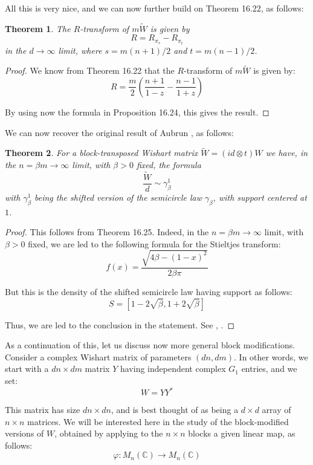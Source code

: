 \documentclass[12pt]{amsbook}
\newtheorem{theorem}{Theorem}[chapter]
\begin{document}
All this is very nice, and we can now further build on Theorem 16.22, as follows:

\begin{theorem}
The $R$-transform of $m\widetilde{W}$ is given by
$$R=R_{\pi_s}-R_{\pi_t}$$
in the $d\to\infty$ limit, where $s=m(n+1)/2$ and $t=m(n-1)/2$.
\end{theorem}

\begin{proof}
We know from Theorem 16.22 that the $R$-transform of $m\widetilde{W}$ is given by:
$$R=\frac{m}{2}\left(\frac{n+1}{1-z}-\frac{n-1}{1+z}\right)$$

By using now the formula in Proposition 16.24, this gives the result.
\end{proof}

We can now recover the original result of Aubrun \cite{aub}, as follows:

\begin{theorem}
For a block-transposed Wishart matrix $\widetilde{W}=(id\otimes t)W$ we have, in the $n=\beta m\to\infty$ limit, with $\beta>0$ fixed, the formula
$$\frac{\widetilde{W}}{d}\sim\gamma_{\beta}^1$$
with $\gamma_\beta^1$ being the shifted version of the semicircle law $\gamma_\beta$, with support centered at $1$.
\end{theorem}

\begin{proof}
This follows from Theorem 16.25. Indeed, in the $n=\beta m\to\infty$ limit, with $\beta>0$ fixed, we are led to the following formula for the Stieltjes transform:
$$f(x)=\frac{\sqrt{4\beta-(1-x)^2}}{2\beta\pi}$$

But this is the density of the shifted semicircle law having support as follows:
$$S=[1-2\sqrt{\beta},1+2\sqrt{\beta}]$$

Thus, we are led to the conclusion in the statement. See \cite{aub}, \cite{bne}.
\end{proof}

As a continuation of this, let us discuss  now more general block modifications. Consider a complex Wishart matrix of parameters $(dn,dm)$. In other words, we start with a $dn\times dm$ matrix $Y$ having independent complex $G_1$ entries, and we set:
$$W=YY^*$$

This matrix has size $dn\times dn$, and is best thought of as being a $d\times d$ array of $n\times n$ matrices. We will be interested here in the study of the block-modified versions of $W$, obtained by applying to the $n\times n$ blocks a given linear map, as follows:
$$\varphi:M_n(\mathbb C)\to M_n(\mathbb C)$$
\end{document}
